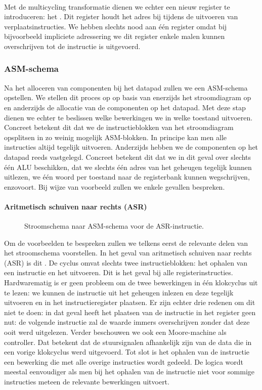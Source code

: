 \paragraph{}
Met de multicycling transformatie dienen we echter een nieuw register te introduceren: het . Dit register houdt het adres bij tijdens de uitvoeren van verplaatsinstructies. We hebben slechts nood aan \'e\'en register omdat bij bijvoorbeeld impliciete adressering we dit register enkele malen kunnen overschrijven tot de instructie is uitgevoerd.
\subsubsection{ASM-schema}
Na het alloceren van componenten bij het datapad zullen we een ASM-schema opstellen. We stellen dit proces op op basis van enerzijds het stroomdiagram op  en anderzijds de allocatie van de componenten op het datapad. Met deze stap dienen we echter te beslissen welke bewerkingen we in welke toestand uitvoeren. Concreet betekent dit dat we de instructieblokken van het stroomdiagram opsplitsen in zo weinig mogelijk ASM-blokken. In principe kan men alle instructies altijd tegelijk uitvoeren. Anderzijds hebben we de componenten op het datapad reeds vastgelegd. Concreet betekent dit dat we in dit geval over slechts \'e\'en ALU beschikken, dat we slechts \'e\'en adres van het geheugen tegelijk kunnen uitlezen, we \'e\'en woord per toestand naar de registerbank kunnen wegschrijven, enzovoort. Bij wijze van voorbeeld zullen we enkele gevallen bespreken.
\paragraph{Aritmetisch schuiven naar rechts (ASR)}
\begin{figure}[hbt]
\centering
{}
\caption{Stroomschema naar ASM-schema voor de ASR-instructie.}
\label{flowasm-asr}
\end{figure}
Om de voorbeelden te bespreken zullen we telkens eerst de relevante delen van het stroomschema voorstellen. In het geval van aritmetisch schuiven naar rechts (ASR) is dit . De cyclus omvat slechts twee instructieblokken: het ophalen van een instructie en het uitvoeren. Dit is het geval bij alle registerinstructies. Hardwarematig is er geen probleem om de twee bewerkingen in \'e\'en klokcyclus uit te lezen: we kunnen de instructie uit het geheugen inlezen en deze tegelijk uitvoeren en in het instructieregister plaatsen. Er zijn echter drie redenen om dit niet te doen: in dat geval heeft het plaatsen van de instructie in het register geen nut: de volgende instructie zal de waarde immers overschrijven zonder dat deze ooit werd uitgelezen. Verder beschouwen we ook een Moore-machine als controller. Dat betekent dat de stuursignalen afhankelijk zijn van de data die in een vorige klokcyclus werd uitgevoerd. Tot slot is het ophalen van de instructie een bewerking die met alle overige instructies wordt gedeeld. De logica wordt meestal eenvoudiger als men bij het ophalen van de instructie niet voor sommige instructies meteen de relevante bewerkingen uitvoert.
